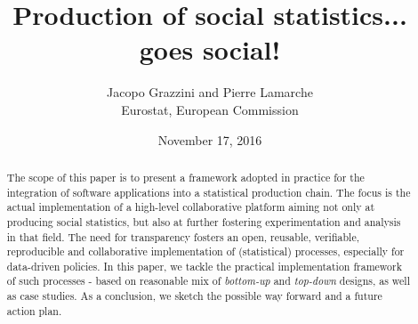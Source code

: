 \documentclass[11pt, a4paper]{article}%
\begin{document}
\title{Production of social statistics... goes social!}
\author{Jacopo Grazzini and Pierre Lamarche
\\Eurostat, European Commission}
\date{November 17, 2016}

\maketitle

\begin{abstract}
The scope of this paper is to present a framework adopted in practice for the integration of software applications into a statistical production chain. The focus is the actual implementation of a high-level collaborative platform aiming not only at producing social statistics, but also at further fostering experimentation and analysis in that field. The need for transparency fosters an open, reusable, verifiable, reproducible and collaborative implementation of (statistical) processes, especially for data-driven policies. In this paper, we tackle the practical implementation framework of such processes - based on reasonable mix of \textit{bottom-up} and \textit{top-down} designs, as well as case studies. As a conclusion, we sketch the possible way forward and a future action plan.
\end{abstract}

\clearpage







%

\nocite{*}

\end{document}
